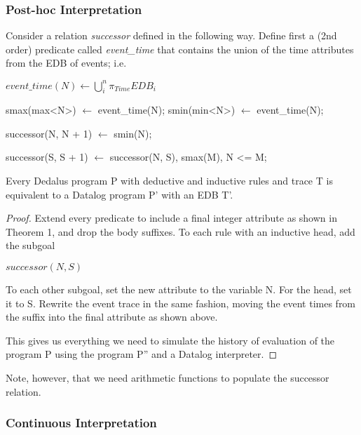 \subsubsection{Post-hoc Interpretation}

Consider a relation \emph{successor} defined in the following way.
Define first a (2nd order) predicate called \emph{event\_time} 
that contains the union of the time attributes from the EDB of events; i.e.

$event\_time(N) \leftarrow \displaystyle\bigcup_{i}^n \pi_{Time}EDB_{i}$

\begin{Dedalus}
smax(max<N>) \(\leftarrow\) event\_time(N);
smin(min<N>) \(\leftarrow\) event\_time(N);

successor(N, N + 1) \(\leftarrow\) smin(N);

successor(S, S + 1) \(\leftarrow\) 
    successor(N, S),
    smax(M),
    N <= M;
\end{Dedalus}


\begin{theorem}
Every Dedalus program P with deductive and inductive rules and trace T is equivalent to a Datalog program P' with an EDB T'.
\end{theorem}

\begin{proof}

Extend every predicate to include a final integer attribute as shown in Theorem 1, and drop the body suffixes.  To each rule with an 
inductive head, add the subgoal 

$successor(N, S)$

To each other subgoal, set the new attribute to the variable N.  For the head, set it to S.  Rewrite the event trace in the same fashion, 
moving the event times from the suffix into the final attribute as shown above.


This gives us everything we need to simulate the history of evaluation of the program P using the program P'' and a Datalog interpreter.

\end{proof}

Note, however, that we need arithmetic functions to populate the successor relation.

\subsubsection{Continuous Interpretation}

